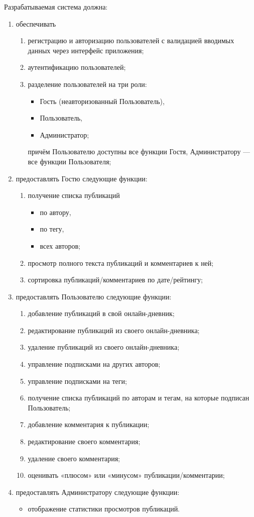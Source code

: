 Разрабатываемая система должна:
\begin{enumerate}
	\item обеспечивать
	\begin{enumerate}
		\item регистрацию и авторизацию пользователей с валидацией вводимых данных через интерфейс приложения;
		\item аутентификацию пользователей;
		\item разделение пользователей на три роли:
		\begin{itemize}
			\item Гость (неавторизованный Пользователь),
			\item Пользователь,
			\item Администратор;
		\end{itemize}
		причём Пользователю доступны все функции Гостя, Администратору — все функции Пользователя;
	\end{enumerate}
	\item предоставлять Гостю следующие функции:
	\begin{enumerate}
		\item получение списка публикаций
		\begin{itemize}
			\item по автору,
			\item по тегу,
			\item всех авторов;
		\end{itemize}
		\item просмотр полного текста публикаций и комментариев к ней;
		\item сортировка публикаций/комментариев по дате/рейтингу;
	\end{enumerate}
	\item предоставлять Пользователю следующие функции:
	\begin{enumerate}
		\item добавление публикаций в свой онлайн-дневник;
		\item редактирование публикаций из своего онлайн-дневника;
		\item удаление публикаций из своего онлайн-дневника;
		\item управление подписками на других авторов;
		\item управление подписками на теги;
		\item получение списка публикаций по авторам и тегам, на которые подписан Пользователь;
		\item добавление комментария к публикации;
		\item редактирование своего комментария;
		\item удаление своего комментария;
		\item оценивать «плюсом» или «минусом» публикации/комментарии;
	\end{enumerate}
	\item предоставлять Администратору следующие функции:
	\begin{itemize}
		\item отображение статистики просмотров публикаций.
	\end{itemize}
\end{enumerate}

